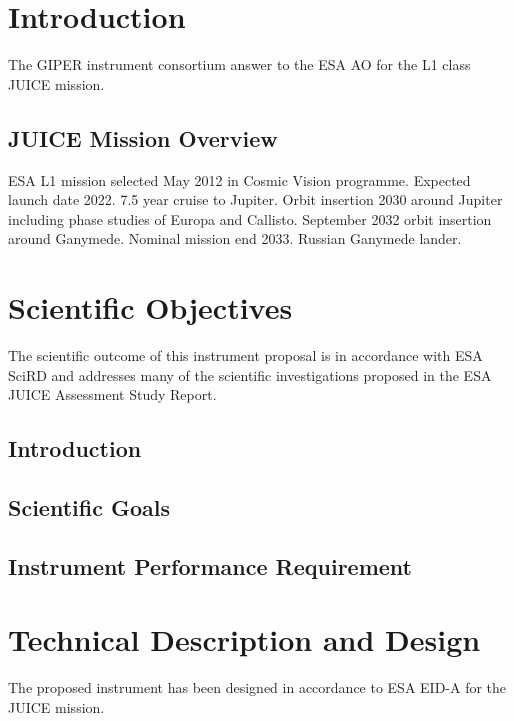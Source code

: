 \section{Introduction}
\label{sec:introduction}
%
The GIPER instrument consortium answer to the ESA \ac{AO}\cite{JUICE_AO} for the L1 class \ac{JUICE} mission.
%
%
\subsection{JUICE Mission Overview}
ESA L1 mission selected May 2012 in Cosmic Vision programme. Expected launch date 2022. 7.5 year cruise to Jupiter. Orbit insertion 2030 around Jupiter including phase studies of Europa and Callisto. September 2032 orbit insertion around Ganymede. Nominal mission end 2033. Russian Ganymede lander.
%
%
\section{Scientific Objectives}
%
The scientific outcome of this instrument proposal is in accordance with ESA \ac{SciRD}\cite{SciRD} and addresses many of the scientific investigations proposed in the ESA JUICE Assessment Study Report\cite{yellowbook}.
%
%

\subsection{Introduction}
\subsection{Scientific Goals}
\subsection{Instrument Performance Requirement}
%
%
%
\section{Technical Description and Design}
%
The proposed instrument has been designed in accordance to ESA \ac{EID-A} for the \ac{JUICE} mission\cite{EIDA}.
%
